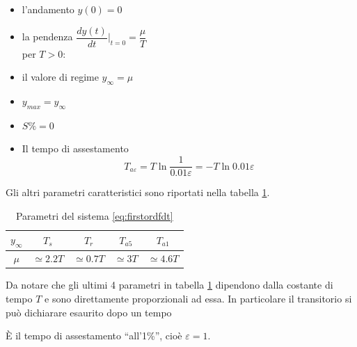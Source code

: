 \documentclass[a4paper]{report}
\begin{document}
\begin{itemize}
\item l'andamento $y(0) = 0$
\item la pendenza {\Large$\dfrac{dy(t)}{dt}\big |_{t=0} = \dfrac{\mu}{T}$}\\
per $T>0$:
\item il valore di regime $y_{\infty} = \mu$
\item $y_{max} = y_{\infty}$
\item $S\% = 0$
\item Il tempo di assestamento
\begin{displaymath}
  T_{a\varepsilon} = T \ln{\dfrac{1}{0.01\varepsilon}} = -T \ln0.01 \varepsilon 
\end{displaymath}
\end{itemize}
Gli altri parametri caratteristici sono riportati nella tabella
\ref{tab:tabfirstordparms}.
\begin{table}[!h]
  \begin{center}
    \begin{tabular}{|c|c|c|c|c|}
      \hline
      $y_\infty$ & $T_s$ & $T_r$ & $T_{a5}$ & $T_{a1}$\\
      \hline
      $\mu$ & $\simeq 2.2T$ & $\simeq 0.7T$ & $\simeq 3T$ & $\simeq 4.6T$\\
      \hline
    \end{tabular}
  \end{center}
  \caption{Parametri del sistema \ref{eq:firstordfdt}}
  \label{tab:tabfirstordparms}
\end{table}

Da notare che gli ultimi 4 parametri in tabella
\ref{tab:tabfirstordparms} dipendono dalla costante di tempo $T$ e sono
direttamente proporzionali ad essa. In particolare il transitorio si
pu\`o dichiarare esaurito dopo un tempo \\
\begin{center}
  \label{transit}
\end{center}
\`E il tempo di assestamento ``all'1\%'', cio\`e $\varepsilon = 1$.
\end{document}
